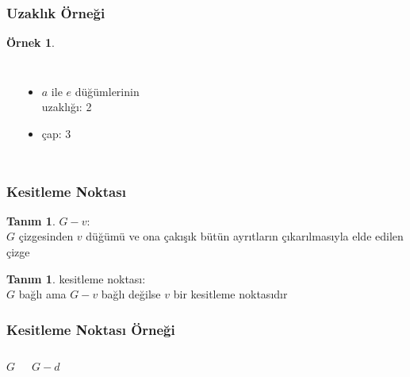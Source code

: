 \documentclass[dvipsnames]{beamer}
\theoremstyle{definition}
\newtheorem{tanim}[theorem]{Tanım}
\theoremstyle{example}
\newtheorem{ornek}[theorem]{Örnek}
\theoremstyle{plain}
\begin{document}
\begin{frame}
  \frametitle{Uzaklık Örneği}

  \begin{ornek}
    \begin{columns}
      \begin{center}
      \end{center}

      \pause
      \begin{itemize}
        \item $a$ ile $e$ düğümlerinin\\
          uzaklığı: 2
        \item çap: 3
      \end{itemize}
    \end{columns}
  \end{ornek}
\end{frame}

\begin{frame}
  \frametitle{Kesitleme Noktası}

  \begin{tanim}
    \alert{$G - v$}:\\
    $G$ çizgesinden $v$ düğümü ve ona çakışık bütün ayrıtların çıkarılmasıyla
    elde edilen çizge
  \end{tanim}

  \pause
  \begin{tanim}
    \alert{kesitleme noktası}:\\
    $G$ bağlı ama $G - v$ bağlı değilse $v$ bir kesitleme noktasıdır
  \end{tanim}
\end{frame}

\begin{frame}
  \frametitle{Kesitleme Noktası Örneği}

  \begin{columns}
    \begin{block}{$G$}
      \begin{center}
      \end{center}
    \end{block}

    \begin{block}{$G - d$}
      \begin{center}
      \end{center}
    \end{block}
  \end{columns}
\end{frame}
\end{document}
